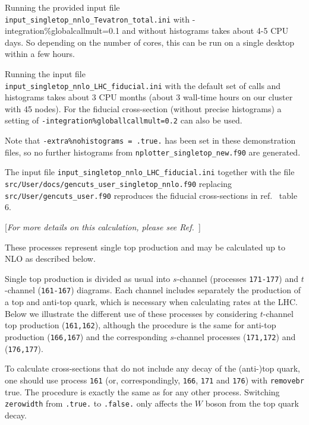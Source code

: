 Running the provided input file \\
\texttt{input\_singletop\_nnlo\_Tevatron\_total.ini} with
-integration\%globalcallmult=0.1 and without histograms takes about 4-5
CPU days. So depending on the number of cores, this can be run on a
single desktop within a few hours.

Running the input file \\
\texttt{input\_singletop\_nnlo\_LHC\_fiducial.ini} with the default set
of calls and histograms takes about 3 CPU months (about 3 wall-time
hours on our cluster with 45 nodes). For the fiducial cross-section
(without precise histograms) a setting of
\texttt{-integration\%globallcallmult=0.2} can also be used.

Note that \texttt{-extra\%nohistograms\ =\ .true.} has been set in these
demonstration files, so no further histograms from
\texttt{nplotter\_singletop\_new.f90} are generated.

The input file \texttt{input\_singletop\_nnlo\_LHC\_fiducial.ini}
together with the file \\
\texttt{src/User/docs/gencuts\_user\_singletop\_nnlo.f90} replacing
\texttt{src/User/gencuts\_user.f90} reproduces the fiducial
cross-sections in ref.~\cite{Campbell:2020fhf} table 6.


\label{subsec:stop}

\begin{center}
[{\it For more details on this calculation, please see Ref.~\cite{Campbell:2004ch}}]
\end{center}

These processes represent single top production and may be calculated up to
NLO as described below.

Single top production is divided as usual into $s$-channel 
(processes {\tt 171-177}) and $t$-channel ({\tt 161-167})
diagrams. Each channel includes separately the production of a top
and anti-top quark, which is necessary when calculating rates at the LHC.
Below we illustrate the different use of these processes by considering
$t$-channel top production ({\tt 161,162}), although the procedure is the same
for anti-top production ({\tt 166,167}) and the corresponding $s$-channel
processes ({\tt 171,172}) and ({\tt 176,177}).


To calculate cross-sections that do not include any decay of the (anti-)top
quark, one should use process {\tt 161}
(or, correspondingly, {\tt 166}, {\tt 171} and {\tt 176}) with {\tt removebr}
true. The procedure is exactly the same
as for any other process.
Switching {\tt zerowidth} from {\tt .true.} to {\tt .false.} only affects
the $W$ boson from the top quark decay.

